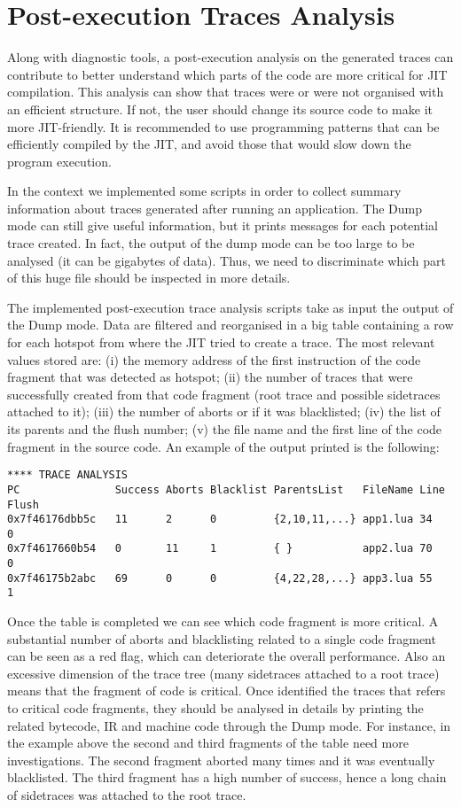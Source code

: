 \section{Post-execution Traces Analysis}
\label{Sec:post-execution-trace-analysis}
Along with diagnostic tools, a post-execution analysis on the generated traces can contribute to better understand which parts of the code are more critical for JIT compilation. This analysis can show that traces were or were not organised with an efficient structure. If not, the user should change its source code to make it more JIT-friendly. It is recommended to use programming patterns that can be efficiently compiled by the JIT, and avoid those that would slow down the program execution.

In the context we implemented some scripts in order to collect summary information about traces generated after running an application. The Dump mode can still give useful information, but it prints messages for each potential trace created. In fact, the output of the dump mode can be too large to be analysed (it can be gigabytes of data). Thus, we need to discriminate which part of this huge file should be inspected in more details. 

The implemented post-execution trace analysis scripts  take as input the output of the Dump mode. Data are filtered and reorganised in a big table containing a row for each hotspot from where the JIT tried to create a trace. The most relevant values stored are: (i) the memory address of the first instruction of the code fragment that was detected as hotspot; (ii) the number of traces that were successfully created from that code fragment (root trace and possible sidetraces attached to it); (iii) the number of aborts or if it was blacklisted; (iv) the list of its parents and the flush number; (v) the file name and the first line of the code fragment in the source code. An example of the output printed is the following:

\begin{lstlisting}[style=CommandsLuaJIT]
**** TRACE ANALYSIS
PC               Success Aborts Blacklist ParentsList   FileName Line Flush
0x7f46176dbb5c   11      2      0         {2,10,11,...} app1.lua 34   0 
0x7f4617660b54   0       11     1         { }           app2.lua 70   0
0x7f46175b2abc   69      0      0         {4,22,28,...} app3.lua 55   1
\end{lstlisting}

\noindent
Once the table is completed we can see which code fragment is more critical. A substantial number of aborts and blacklisting related to a single code fragment can be seen as a red flag, which can deteriorate the overall performance. Also an excessive dimension of the trace tree (many sidetraces attached to a root trace) means that the fragment of code is critical. Once identified the traces that refers to critical code fragments, they should be analysed in details by printing the related bytecode, IR and machine code through the Dump mode. For instance, in the example above the second and third fragments of the table need more investigations. The second fragment aborted many times and it was eventually blacklisted. The third fragment has a high number of success, hence a long chain of sidetraces was attached to the root trace. 
